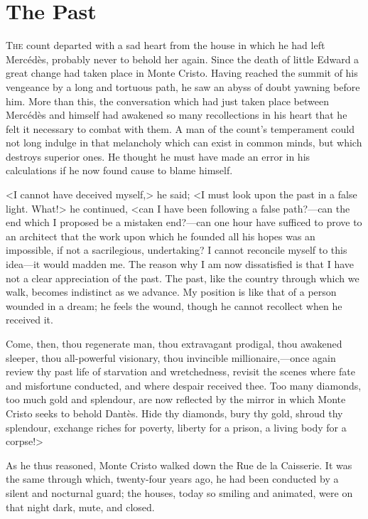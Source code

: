 \chapter{The Past} 

 \lettrine{T}{he} count departed with a sad heart from the house in which he had left Mercédès, probably never to behold her again. Since the death of little Edward a great change had taken place in Monte Cristo. Having reached the summit of his vengeance by a long and tortuous path, he saw an abyss of doubt yawning before him. More than this, the conversation which had just taken place between Mercédès and himself had awakened so many recollections in his heart that he felt it necessary to combat with them. A man of the count's temperament could not long indulge in that melancholy which can exist in common minds, but which destroys superior ones. He thought he must have made an error in his calculations if he now found cause to blame himself. 

 <I cannot have deceived myself,> he said; <I must look upon the past in a false light. What!> he continued, <can I have been following a false path?—can the end which I proposed be a mistaken end?—can one hour have sufficed to prove to an architect that the work upon which he founded all his hopes was an impossible, if not a sacrilegious, undertaking? I cannot reconcile myself to this idea—it would madden me. The reason why I am now dissatisfied is that I have not a clear appreciation of the past. The past, like the country through which we walk, becomes indistinct as we advance. My position is like that of a person wounded in a dream; he feels the wound, though he cannot recollect when he received it. 

Come, then, thou regenerate man, thou extravagant prodigal, thou awakened sleeper, thou all-powerful visionary, thou invincible millionaire,—once again review thy past life of starvation and wretchedness, revisit the scenes where fate and misfortune conducted, and where despair received thee. Too many diamonds, too much gold and splendour, are now reflected by the mirror in which Monte Cristo seeks to behold Dantès. Hide thy diamonds, bury thy gold, shroud thy splendour, exchange riches for poverty, liberty for a prison, a living body for a corpse!> 

 As he thus reasoned, Monte Cristo walked down the Rue de la Caisserie. It was the same through which, twenty-four years ago, he had been conducted by a silent and nocturnal guard; the houses, today so smiling and animated, were on that night dark, mute, and closed. 

